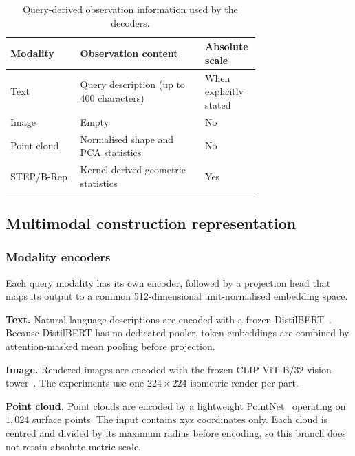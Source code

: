 \documentclass[preprint,12pt]{elsarticle}
\begin{document}
\begin{table}[htbp]
  \centering
  \small
  \caption{Query-derived observation information used by the decoders.}
  \label{tab:observation}
  \begin{tabular}{
      l
      >{\raggedright\arraybackslash}p{0.50\linewidth}
      >{\raggedright\arraybackslash}p{0.22\linewidth}
    }
    \toprule
    Modality & Observation content                      & Absolute scale \\
    \midrule
    Text
             & Query description (up to 400 characters)
             & When explicitly stated                                    \\
    Image
             & Empty
             & No                                                        \\
    Point cloud
             & Normalised shape and PCA statistics
             & No                                                        \\
    STEP/B-Rep
             & Kernel-derived geometric statistics
             & Yes                                                       \\
    \bottomrule
  \end{tabular}
\end{table}

\subsection{Multimodal construction representation}
\label{sec:multimodal_rep}

\subsubsection{Modality encoders}
\label{sec:encoders}

Each query modality has its own encoder, followed by a projection head that
maps its output to a common 512-dimensional unit-normalised embedding space.

\textbf{Text.}
Natural-language descriptions are encoded with a frozen
DistilBERT~\cite{sanh2020distilbert}. Because DistilBERT has no dedicated
pooler, token embeddings are combined by attention-masked mean pooling before
projection.

\textbf{Image.}
Rendered images are encoded with the frozen CLIP ViT-B/32 vision
tower~\cite{radford2021clip}. The experiments use one $224\times224$
isometric render per part.

\textbf{Point cloud.}
Point clouds are encoded by a lightweight
PointNet~\cite{qi2017pointnet} operating on $1{,}024$ surface points. The
input contains xyz coordinates only. Each cloud is centred and divided by its
maximum radius before encoding, so this branch does not retain absolute metric
scale.
\end{document}
